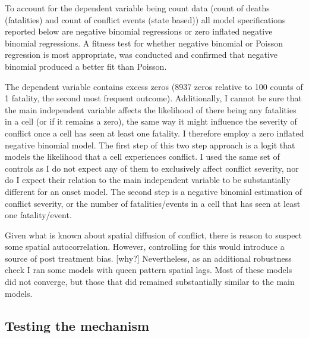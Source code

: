 \documentclass[12pt]{article}
\begin{document}
To account for the dependent variable being count data (count of deaths
(fatalities) and count of conflict events (state based)) all model
specifications reported below are negative binomial regressions or zero inflated
negative binomial regressions. A fitness test for whether negative binomial or
Poisson regression is most appropriate, was conducted and confirmed that
negative binomial produced a better fit than Poisson.

The dependent variable contains excess zeros (8937 zeros relative to 100 counts
of 1 fatality, the second most frequent outcome). Additionally, I cannot be sure
that the main independent variable affects the likelihood of there being any
fatalities in a cell (or if it remains a zero), the same way it might influence
the severity of conflict once a cell has seen at least one fatality. I therefore
employ a zero inflated negative binomial model. The first step of this two step
approach is a logit that models the likelihood that a cell experiences conflict.
I used the same set of controls as I do not expect any of them to exclusively
affect conflict severity, nor do I expect their relation to the main independent
variable to be substantially different for an onset model. The second step is a
negative binomial estimation of conflict severity, or the number of
fatalities/events in a cell that has seen at least one fatality/event.

Given what is known about spatial diffusion of conflict, there is reason to
suspect some spatial autocorrelation. However, controlling for this would
introduce a source of post treatment bias. [why?] Nevertheless, as an additional
robustness check I ran some models with queen pattern spatial lags. Most of
these models did not converge, but those that did remained substantially similar
to the main models.

\subsection{Testing the mechanism} \label{Testing the mechanism}
\end{document}
